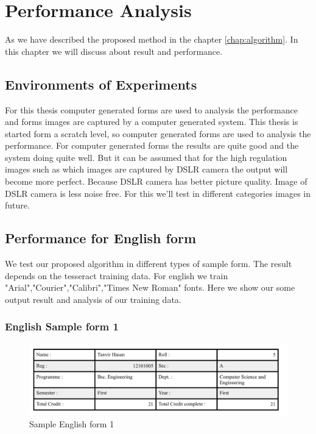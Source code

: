\chapter {Performance Analysis}
\label{chap:result}
As we have described the proposed method in the chapter \ref{chap:algorithm}. In this chapter we will discuss about result and performance.
\section{Environments of Experiments}
For this thesis computer generated forms are used to analysis the performance and forms images are captured by a computer generated system. This thesis is started form a scratch level, so computer generated forms are used to analysis the performance. For computer generated forms the results are quite good and the system doing quite well. But it can be assumed that for the high regulation images such as which images are captured by DSLR camera the output will become more perfect. Because DSLR camera has better picture quality. Image of DSLR camera is less noise free. For this we’ll test in different categories images in future.  
   
\section{Performance for English form}
We test our proposed algorithm in different types of sample form. The result depends on the tesseract training data. For english we train "Arial","Courier","Calibri","Times New Roman" fonts. Here we show our some output result and analysis of our training data.
\subsection{English Sample form 1}

\begin{figure}[H]
\centering
\includegraphics[width=1\textwidth]{form1.png}
\caption {Sample English form 1}
\label {fig:form1}
\end{figure}


